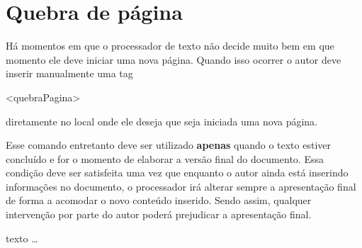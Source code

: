 \newpage \chapter{Quebra de página}\setcounter{SteP}{1}

Há momentos em que o processador de texto não decide muito bem em que momento
ele deve iniciar uma nova página. Quando isso ocorrer o autor deve inserir
manualmente uma tag

\begin{BoxVerbatim}
	<quebraPagina>
\end{BoxVerbatim}

diretamente no local onde ele deseja que seja iniciada uma nova página.

Esse comando entretanto deve ser utilizado {\bf apenas} quando o texto
estiver concluído e for o momento de elaborar a versão final do documento.
Essa condição deve ser satisfeita uma vez que enquanto o autor ainda está
inserindo informações no documento, o processador irá alterar sempre a
apresentação final de forma a acomodar o novo conteúdo inserido. Sendo assim,
qualquer intervenção por parte do autor poderá prejudicar a apresentação
final.

texto \ldots

